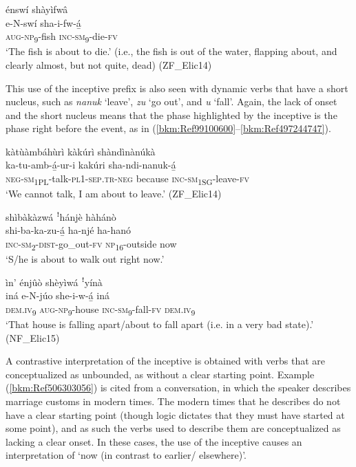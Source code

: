 \ea
\label{bkm:Ref507158244}
énswí shàyìfwâ\\
\gll e-N-swí    sha-i-fw-á̲\\
\textsc{aug}-\textsc{np}\textsubscript{9}-fish  \textsc{inc}-\textsc{sm}\textsubscript{9}-die-\textsc{fv}\\
\glt ‘The fish is about to die.’ (i.e., the fish is out of the water, flapping about, and clearly almost, but not quite, dead) (ZF\_Elic14)
\z

This use of the inceptive prefix is also seen with dynamic verbs that have a short nucleus, such as \textit{nanuk} ‘leave’, \textit{zu} ‘go out’, and \textit{u} ‘fall’. Again, the lack of onset and the short nucleus means that the phase highlighted by the inceptive is the phase right before the event, as in (\ref{bkm:Ref99100600}--\ref{bkm:Ref497244747}).

\ea
\label{bkm:Ref99100600}
kàtùàmbáhùrì kàkúrì shàndìnànúkà\\
\gll ka-tu-amb-á̲-ur-i      kakúri    sha-ndi-nanuk-á̲\\
\textsc{neg}-\textsc{sm}\textsubscript{1PL}-talk-\textsc{pl}1-\textsc{sep}.\textsc{tr}-\textsc{neg}  because  \textsc{inc}-\textsc{sm}\textsubscript{1SG}-leave-\textsc{fv}\\
\glt ‘We cannot talk, I am about to leave.’ (ZF\_Elic14)
\z

\ea
shìbàkàzwá ꜝhánjè hàhánò\\
\gll shi-ba-ka-zu-á̲    ha-njé    ha-hanó\\
\textsc{inc}-\textsc{sm}\textsubscript{2}-\textsc{dist}-go\_out-\textsc{fv}  \textsc{np}\textsubscript{16}-outside  now\\
\glt ‘S/he is about to walk out right now.’
\z

\ea
\label{bkm:Ref497244747}
ìn’ énjûò shèyìwá ꜝyínà\\
\gll iná    e-N-júo    she-i-w-á̲    iná\\
\textsc{dem}.\textsc{iv}\textsubscript{9}  \textsc{aug}-\textsc{np}\textsubscript{9}-house  \textsc{inc}-\textsc{sm}\textsubscript{9}-fall-\textsc{fv}  \textsc{dem}.\textsc{iv}\textsubscript{9}\\
\glt ‘That house is falling apart/about to fall apart (i.e. in a very bad state).’ (NF\_Elic15)
\z

A contrastive interpretation of the inceptive is obtained with verbs that are conceptualized as unbounded, as without a clear starting point. Example (\ref{bkm:Ref506303056}) is cited from a conversation, in which the speaker describes marriage customs in modern times. The modern times that he describes do not have a clear starting point (though logic dictates that they must have started at some point), and as such the verbs used to describe them are conceptualized as lacking a clear onset. In these cases, the use of the inceptive causes an interpretation of ‘now (in contrast to earlier/ elsewhere)’.

